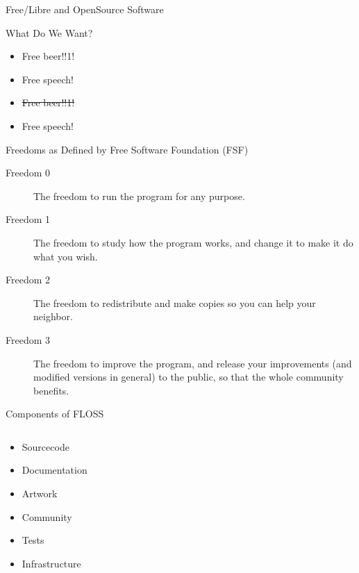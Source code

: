 \documentclass{beamer}
\begin{document}
\begin{frame}{Free/Libre and OpenSource Software}
    \begin{block}{What Do We Want?}
        {
            \begin{itemize}
                \item Free beer!!1!
                \item<2-> Free speech!
            \end{itemize}
        }

        {
            \begin{itemize}
                \item \sout{Free beer!!1!}
                \item Free speech!
            \end{itemize}
        }
    \end{block}

    {
        \begin{block}{Freedoms as Defined by Free Software Foundation (FSF)}
            \begin{description}
                \item[Freedom 0] The freedom to run the program for any
                    purpose.
                \item[Freedom 1] The freedom to study how the program
                    works, and change it to make it do what you wish.
                \item[Freedom 2] The freedom to redistribute and make
                    copies so you can help your neighbor.
                \item[Freedom 3] The freedom to improve the program, and
                    release your improvements (and modified versions in
                    general) to the public, so that the whole community
                    benefits.
            \end{description}
        \end{block}
    }
\end{frame}

\begin{frame}{Components of FLOSS}
    \begin{columns}[T]
        \begin{column}{0.5\textwidth}
            \begin{itemize}
                \item Sourcecode
                \item Documentation
                \item Artwork
                \item Community
                \item Tests
                \item Infrastructure
            \end{itemize}
        \end{column}
        \begin{column}{0.5\textwidth}
            
        \end{column}
    \end{columns}
\end{frame}
\end{document}
